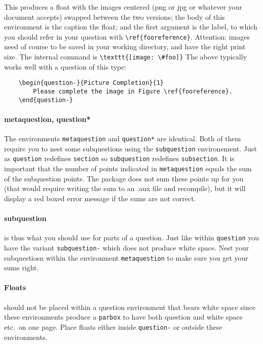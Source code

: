 \documentclass[a4paper]{scrartcl}
\begin{document}
This produces a float with the images centered (png or jpg or whatever your document accepts) swapped between the two versions; the body of this environment is the caption the float; and the first argument is the label, to which you should refer in your question with \verb|\ref{fooreference}|. Attention: images need of course to be saved in your working directory, and have the right print size. The internal command is \verb|\texttt{[image: \#foo]}| The above typically works well with a question of this type:

\begin{verbatim}
    \begin{question-}{Picture Completion}{1}
        Please complete the image in Figure \ref{fooreference}.
    \end{question-}
\end{verbatim}


\paragraph{metaquestion, question*}

The environments \verb|metaquestion| and \verb|question*| are identical. Both of them require you to nest some subquestions using the \verb|subquestion| environement. Just as \verb|question| redefines \verb|section| so \verb|subquestion| redefines \verb|subsection|. It is important that the number of points indicated in  \verb|metaquestion| equals the sum of the subquestion points. The package does not sum these points up for you (that would require writing the sum to an .aux file and recompile), but it will display a red boxed error message if the sums are not correct.

\paragraph{subquestion} is thus what you should use for parts of a question. Just like within \verb|question| you have the variant \verb|subquestion-| which does not produce white space. Nest your subquestiosn within the environment \verb|metaquestion|  to make sure you get your sums right.

\paragraph{Floats} should not be placed within a question environment that bears white space since these environments produce a \verb|parbox| to have both question and white space etc.\ on one page. Place floats either inside \verb|question-| or outside these environments. 
\end{document}

